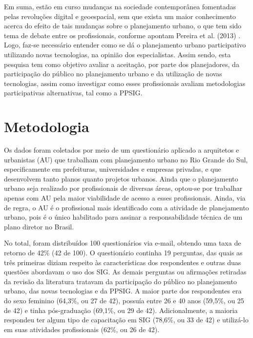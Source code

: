 \documentclass{article}
\begin{document}
Em suma, estão em curso mudanças na sociedade contemporânea fomentadas pelas
				revoluções digital e geoespacial, sem que exista um maior conhecimento acerca do
				efeito de tais mudanças sobre o planejamento urbano, o que tem sido tema de debate
				entre os profissionais, conforme apontam %
Pereira et
					al. (2013)%
. Logo, faz-se necessário entender como se dá o planejamento
				urbano participativo utilizando novas tecnologias, na opinião dos especialistas.
				Assim sendo, esta pesquisa tem como objetivo avaliar a aceitação, por parte dos
				planejadores, da participação do público no planejamento urbano e da utilização de
				novas tecnologias, assim como investigar como esses profissionais avaliam
				metodologias participativas alternativas, tal como a PPSIG.

\section{%
Metodologia}

Os dados foram coletados por meio de um questionário aplicado a arquitetos e
				urbanistas (AU) que trabalham com planejamento urbano no Rio Grande do Sul,
				especificamente em prefeituras, universidades e empresas privadas, e que desenvolvem
				tanto planos quanto projetos urbanos. Ainda que o planejamento urbano seja realizado
				por profissionais de diversas áreas, optou-se por trabalhar apenas com AU pela maior
				viabilidade de acesso a esses profissionais. Ainda, via de regra, o AU é o
				profissional mais identificado com a atividade de planejamento urbano, pois é o
				único habilitado para assinar a responsabilidade técnica de um plano diretor no
				Brasil.

No total, foram distribuídos 100 questionários via e-mail, obtendo uma taxa de
				retorno de 42\% (42 de 100). O questionário continha 19 perguntas, das quais as três
				primeiras diziam respeito às características dos respondentes e outras duas questões
				abordavam o uso dos SIG. As demais perguntas ou afirmações retiradas da revisão da
				literatura tratavam da participação do público no planejamento urbano, das novas
				tecnologias e da PPSIG. A maior parte dos respondentes era do sexo feminino (64,3\%,
				ou 27 de 42), possuía entre 26 e 40 anos (59,5\%, ou 25 de 42) e tinha pós-graduação
				(69,1\%, ou 29 de 42). Adicionalmente, a maioria respondeu ter algum tipo de
				capacitação em SIG (78,6\%, ou 33 de 42) e utilizá-lo em suas atividades
				profissionais (62\%, ou 26 de 42).
\end{document}

